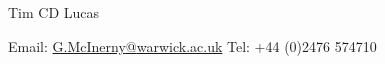 \documentclass{scrartcl}
\begin{document}
\begin{cv}{Tim {\Large CD} Lucas}
\begin{multicols}{2}
\begin{footnotesize}
Email: \href{mailto:g.mcinerny@warwick.ac.uk}{G.McInerny{\scriptsize @}warwick.ac.uk}\vspace{-0.8mm}\newline
Tel: +44 (0)2476 574710
\end{footnotesize}
\end{multicols}




\end{cv}
\end{document}
